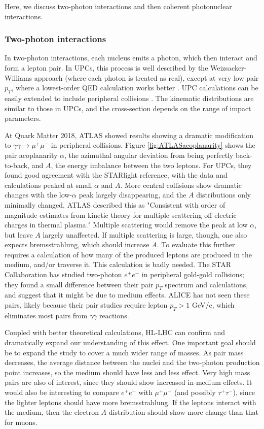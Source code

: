\documentclass[../report.tex]{subfiles}
\begin{document}
Here, we discuss two-photon interactions and then coherent photonuclear interactions. 

\subsubsection{Two-photon interactions}

In two-photon interactions, each nucleus emits a photon, which then interact and form a lepton pair.   In UPCs, this process is well described by the Weizsacker-Williams approach (where each photon is treated as real), except at very low pair $p_T$, where a lowest-order QED calculation works better \cite{Adams:2004rz}.     UPC calculations can be easily extended to include peripheral collisions \cite{Klein:2018cjh, Zha:2018ywo}.  The kinematic distributions are similar to those in UPCs, and the cross-section depends on the range of impact parameters.

At Quark Matter 2018, ATLAS  \cite{Aaron}  showed results showing a dramatic modification to $\gamma\gamma\rightarrow\mu^+\mu^-$ in peripheral collisions.  Figure \ref{fig:ATLASacoplanarity} shows the pair acoplanarity $\alpha$, the azimuthal angular deviation from being perfectly back-to-back, and $A$, the energy imbalance between the two leptons.  For UPCs, they found good agreement with the STARlight \cite{Baltz:2009jk,Klein:2016yzr} reference, with the data and calculations peaked at small $\alpha$ and $A$.   More central collisions show dramatic changes with the low-$\alpha$ peak largely disappearing, and the $A$ distributions only minimally changed.  ATLAS described this as "Consistent with order of magnitude estimates from kinetic theory for multiple scattering off electric charges in thermal plasma."  Multiple scattering would remove the peak at low $\alpha$, but leave $A$ largely unaffected.  If multiple scattering is large, though, one also expects bremsstrahlung, which should increase $A$.   To evaluate this further requires a calculation of how many of the produced leptons are produced in the medium, and/or traverse it.  This calculation is badly needed.   The STAR Collaboration has studied two-photon $e^+e^-$ in peripheral gold-gold collisions; they found a small difference between their pair $p_T$ spectrum and calculations, and suggest that it might be due to medium effects.    ALICE has not seen these pairs, likely because their pair studies require  lepton $p_T > 1$ GeV/c, which eliminates most pairs from $\gamma\gamma$ reactions. 

Coupled with better theoretical calculations, HL-LHC can confirm and dramatically expand our understanding of this effect.   One important goal should be to expand the study to cover a much wider range of masses.  As pair mass decreases, the average distance between the nuclei and the two-photon production point increases, so the medium should have less and less effect.  Very high mass pairs are also of interest, since they should show increased  in-medium effects.   It would also be interesting to compare $e^+e^-$ with $\mu^+\mu^-$ (and possibly $\tau^+\tau^-$), since the lighter leptons should have more bremsstrahlung.  If the leptons interact with the medium, then the electron $A$ distribution should show more change than that for muons.  
\end{document}

